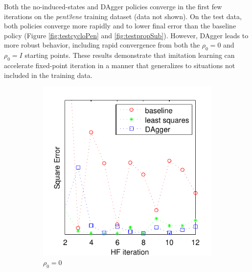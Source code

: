 \documentclass[twoside,11pt]{article}
\begin{document}
Both the no-induced-states and DAgger policies converge in the first few iterations on the \textit{pent3ene} training dataset (data not shown). On the test data, both policies converge more rapidly and to lower final error than the baseline policy (Figure \ref{fig:testcycloPen} and \ref{fig:testpropSub}). However, DAgger leads to more robust behavior, including rapid convergence from both the  $\rho_0 = 0$ and $\rho_0 = I$ starting points. These results demonstrate that imitation learning can accelerate fixed-point iteration in a manner that generalizes to situations not included in the training data.

\begin{figure}[h!]
\centering
\begin{subfigure}{.5\textwidth}
  \centering
  \includegraphics[scale=0.7]{propylsub_pzero_test_12iter.pdf}
  \caption{$\rho_0 = 0$}
  \label{fig:propSub0}
\end{subfigure}%
\begin{subfigure}{.5\textwidth}
  \centering

\end{subfigure}
\end{figure}
\end{document}
